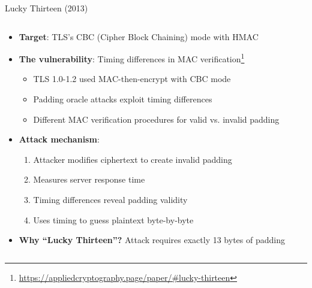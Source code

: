 \documentclass[aspectratio=169, lualatex, handout]{beamer}
\begin{document}
\begin{frame}{Lucky Thirteen (2013)}
	\begin{columns}[c]
		\begin{column}{1\textwidth}
			\begin{itemize}[<+->]
				\item \textbf{Target}: TLS's CBC (Cipher Block Chaining) mode with HMAC
				\item \textbf{The vulnerability}: Timing differences in MAC verification\footnote{\url{https://appliedcryptography.page/paper/\#lucky-thirteen}}
				      \begin{itemize}
					      \item TLS 1.0-1.2 used MAC-then-encrypt with CBC mode
					      \item Padding oracle attacks exploit timing differences
					      \item Different MAC verification procedures for valid vs. invalid padding
				      \end{itemize}
				\item \textbf{Attack mechanism}:
				      \begin{enumerate}
					      \item Attacker modifies ciphertext to create invalid padding
					      \item Measures server response time
					      \item Timing differences reveal padding validity
					      \item Uses timing to guess plaintext byte-by-byte
				      \end{enumerate}
				\item \textbf{Why ``Lucky Thirteen''?} Attack requires exactly 13 bytes of padding
			\end{itemize}
		\end{column}
	\end{columns}
\end{frame}
\end{document}

